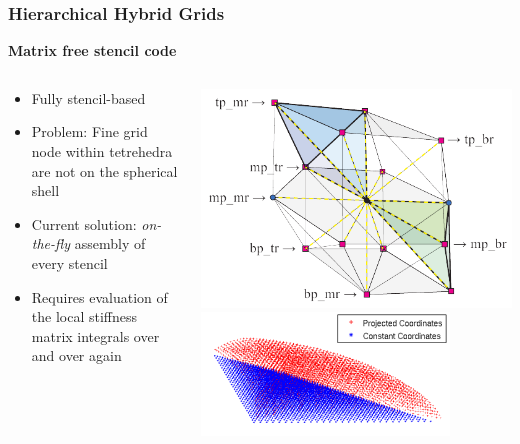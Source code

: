 \documentclass[t,compress=false,usepdftitle=false]{beamer}
\begin{document}
\begin{frame}\frametitle{Hierarchical Hybrid Grids}
\textbf{Matrix free stencil code}
\begin{columns}
\vspace*{-2mm}
\begin{myColorBox}{.9}{}\color{linkcolor}
\centering
\begin{itemize}
 \item Fully stencil-based
 \item Problem: Fine grid node within tetrehedra are not on the spherical shell
 \item Current solution: \textit{on-the-fly} assembly of every stencil
 \item Requires evaluation of the local stiffness matrix integrals over and over again
\end{itemize}
\end{myColorBox}
\vspace*{-12mm}
\includegraphics[width=.95\textwidth]{stencil.png}\\
\vspace*{3mm}
\includegraphics[width=0.8\textwidth]{macroTet_projected_constant_coords.png}
\end{columns}
\end{frame}
\end{document}
